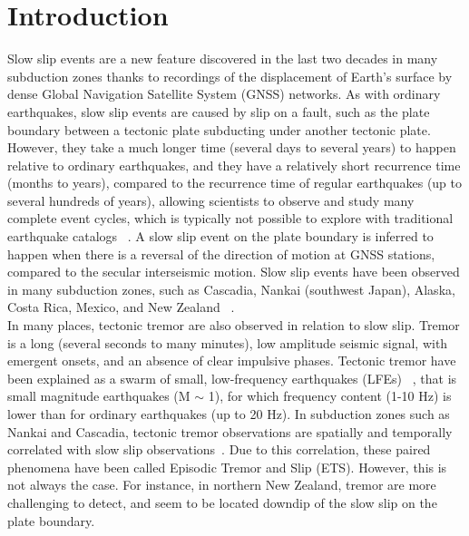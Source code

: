 \documentclass{article}
\begin{document}
\section{Introduction}

Slow slip events are a new feature discovered in the last two decades in many subduction zones thanks to recordings of the displacement of Earth's surface by dense Global Navigation Satellite System (GNSS) networks. As with ordinary earthquakes, slow slip events are caused by slip on a fault, such as the plate boundary between a tectonic plate subducting under another tectonic plate. However, they take a much longer time (several days to several years) to happen relative to ordinary earthquakes, and they have a relatively short recurrence time (months to years), compared to the recurrence time of regular earthquakes (up to several hundreds of years), allowing scientists to observe and study many complete event cycles, which is typically not possible to explore with traditional earthquake catalogs ~\citep{BER_2011}. A slow slip event on the plate boundary is inferred to happen when there is a reversal of the direction of motion at GNSS stations, compared to the secular interseismic motion. Slow slip events have been observed in many subduction zones, such as Cascadia, Nankai (southwest Japan), Alaska, Costa Rica, Mexico, and New Zealand ~\citep{BER_2011,AUD_2016}. \\

In many places, tectonic tremor are also observed in relation to slow slip. Tremor is a long (several seconds to many minutes), low amplitude seismic signal, with emergent onsets, and an absence of clear impulsive phases. Tectonic tremor have been explained as a swarm of small, low-frequency earthquakes (LFEs) ~\citep{SHE_2007_nature}, that is small magnitude earthquakes (M $\sim$ 1), for which frequency content (1-10 Hz) is lower than for ordinary earthquakes (up to 20 Hz). In subduction zones such as Nankai and Cascadia, tectonic tremor observations are spatially and temporally correlated with slow slip observations~\citep{OBA_2002,ROG_2003}. Due to this correlation, these paired phenomena have been called Episodic Tremor and Slip (ETS). However, this is not always the case. For instance, in northern New Zealand, tremor are more challenging to detect, and seem to be located downdip of the slow slip on the plate boundary. \\
\end{document}
